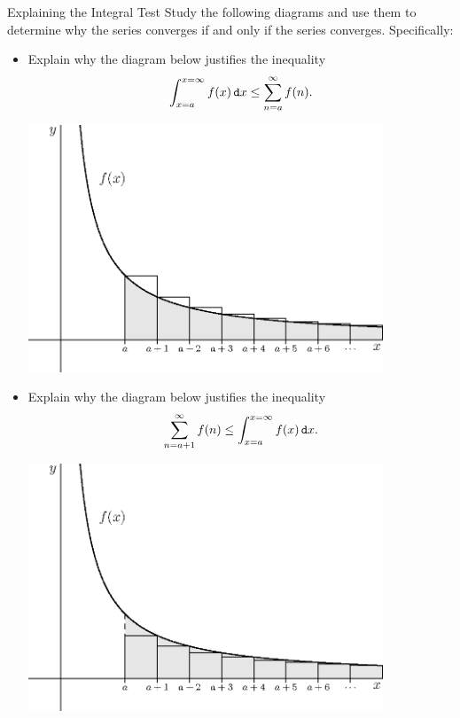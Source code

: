 \begin{exercise}{Explaining the Integral Test \Coffeecup \Coffeecup \Coffeecup}
Study the following diagrams and use them to determine why the series converges if and only if the series converges.  Specifically:


\begin{itemize}
\item Explain why the diagram below justifies the inequality $$\int_{x=a}^{x=\infty} f(x)\mathop{}\!\mathtt{d} x\leq \sum_{n=a}^\infty f(n).  $$
    
    \begin{center}
		\includegraphics[width=300pt]{ChapterSeqSer/Figures/inttest2.eps}
	\end{center}


\vspace*{1in}
\item Explain why the diagram below justifies the inequality $$ \sum_{n=a+1}^\infty f(n)\leq  \int_{x=a}^{x=\infty} f(x)\mathop{}\!\mathtt{d} x.  $$

	\begin{center}
		\includegraphics[width=300pt]{ChapterSeqSer/Figures/inttest1.eps}
	\end{center}
    

\end{itemize}
\end{exercise}
